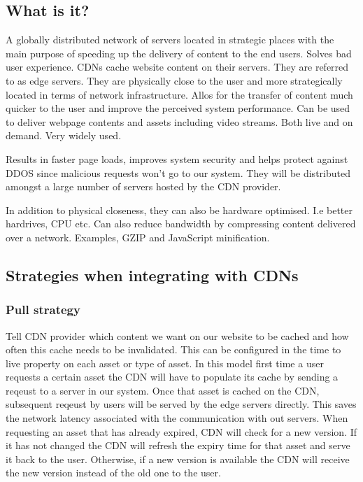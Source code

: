 \documentclass[a4paper, 11pt]{book}
\begin{document}
    \subsection{What is it?}
    A globally distributed network of servers located in strategic places with the main purpose of speeding up the delivery of content to the end users.
    Solves bad user experience.
    CDNs cache website content on their servers.
    They are referred to as edge servers.
    They are physically close to the user and more strategically located in terms of network infrastructure.
    Allos for the transfer of content much quicker to the user and improve the perceived system performance.
    Can be used to deliver webpage contents and assets including video streams.
    Both live and on demand.
    Very widely used.

    Results in faster page loads, improves system security and helps protect against DDOS since malicious requests won't go to our system.
    They will be distributed amongst a large number of servers hosted by the CDN provider.

    In addition to physical closeness, they can also be hardware optimised. I.e better hardrives, CPU etc.
    Can also reduce bandwidth by compressing content delivered over a network.
    Examples, GZIP and JavaScript minification.

    \subsection{Strategies when integrating with CDNs}

    \subsubsection{Pull strategy}
    Tell CDN provider which content we want on our website to be cached and how often this cache needs to be invalidated.
    This can be configured in the time to live property on each asset or type of asset.
    In this model first time a user requests a certain asset the CDN will have to populate its cache by sending a reqeust to a server in our system.
    Once that asset is cached on the CDN, subsequent reqeust by users will be served by the edge servers directly.
    This saves the network latency associated with the communication with out servers.
    When requesting an asset that has already expired, CDN will check for a new version.
    If it has not changed the CDN will refresh the expiry time for that asset and serve it back to the user.
    Otherwise, if a new version is available the CDN will receive the new version instead of the old one to the user.
\end{document}
